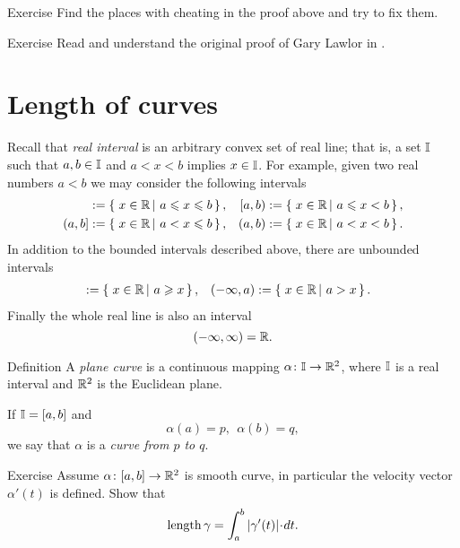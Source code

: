 \begin{thm}{Exercise}
Find the places with cheating in the proof above and try to fix them.
\end{thm}

\begin{thm}{Exercise} Read and understand the original proof of Gary Lawlor in \cite{lawlor}.
\end{thm}



\section{Length of curves}

Recall that \emph{real interval} is an arbitrary convex set of real line;
that is, a set $\mathbb{I}$ such that $a,b\in \mathbb{I}$ and $a<x<b$ implies $x\in\mathbb{I}$.
For example, given two real numbers $a<b$ we may consider the following intervals
\begin{align*}
[a,b]
&\df
\set{x\in \RR}{a\le x\le b},
&
[a,b)
&\df
\set{x\in \RR}{a\le x< b},
\\
(a,b]
&\df
\set{x\in \RR}{a< x\le b},
&
(a,b)
&\df
\set{x\in \RR}{a< x< b}.
\end{align*}
In addition to the bounded intervals described above, there are unbounded intervals
\begin{align*}
[a,\infty)
&\df
\set{x\in \RR}{a\le x},
&
(a,\infty)
&\df
\set{x\in \RR}{a< x},
\\
(-\infty,a]
&\df
\set{x\in \RR}{a\ge x},
&
(-\infty,a)
&\df
\set{x\in \RR}{a> x}.
\end{align*}
Finally the whole real line is also an interval
$$(-\infty,\infty)=\mathbb{R}.$$

\begin{thm}{Definition}\label{def:curve}
A \emph{plane curve} is a continuous mapping $\alpha\colon\mathbb{I}\to \mathbb{R}^2$,
where $\mathbb{I}$ is a real interval and $\mathbb{R}^2$ is the Euclidean plane. 

If $\mathbb{I}=[a,b]$ and 
$$\alpha(a)=p,\ \ \alpha(b)=q,$$
we say that $\alpha$ is a \emph{curve from $p$ to $q$}.
\end{thm}

\begin{thm}{Exercise}
Assume $\alpha\colon[a,b]\to\mathbb{R}^2$ is smooth curve, in particular the velocity vector $\alpha'(t)$ is defined.
Show that
\[\length \gamma=\int_a^b|\gamma'(t)|\cdot dt.\]
\end{thm}



